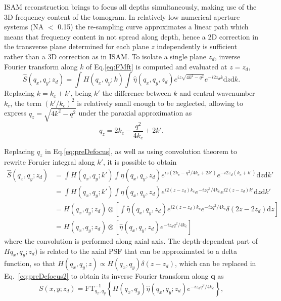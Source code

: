 ISAM reconstruction brings to focus all depths simultaneously, making use of the 3D frequency content of the tomogram. In relatively low numerical aperture systems (NA $<$ 0.15) the re-sampling curve approximates a linear path which means that frequency content in not spread along depth, hence a 2D correction in the transverse plane determined for each plane $z$ independently is sufficient~\cite{Yasuno2006_Noniterative, South2016_Computed} rather than a 3D correction as in ISAM. To isolate a single plane $z_d$, inverse Fourier transform along $k$ of Eq.\eqref{eq:FMft} is computed and evaluated at $z=z_d$,
\begin{equation}\label{eq:preDefocus}
    \hat{S}(q_x,q_y; z_d) = \int H(q_x, q_y; k) \int \hat{\eta}(q_x,q_y, z_d) e^{iz\sqrt{4k^2-q^2}} e^{-i2z_dk} \text{d}z\text{d}k.
\end{equation}
Replacing $k=k_c + k'$, being $k'$ the difference between $k$ and central wavenumber $k_c$, the term $(k'/k_c)^2$ is relatively small enough to be neglected, allowing to express $q_z=\sqrt{4k^2-q^2}$ under the paraxial approximation as~\cite{South2016_Computed}
\begin{equation}\label{eq:qzAprox}
    q_z = 2k_c - \frac{q^2}{4k_c} + 2k'.
\end{equation}

Replacing $q_z$ in Eq.\eqref{eq:preDefocus}, as well as using convolution theorem to rewrite Foruier integral along $k'$, it is possible to obtain~\cite{South2016_Computed}
\begin{align}\label{eq:preDefocus2}
    \hat{S}(q_x,q_y; z_d) &= \int H(q_x, q_y; k') \int \hat{\eta}(q_x,q_y, z_d) e^{iz(2k_c - q^2/4k_c + 2k')} e^{-i2z_d(k_c+k')} \text{d}z\text{d}k' \nonumber \\
    &= \int H(q_x, q_y; k') \int \hat{\eta}(q_x,q_y, z_d) e^{i2(z-z_d)k_c} e^{-izq^2/4k_c} e^{i2(z-z_d)k'} \text{d}z\text{d}k' \nonumber \\
    &= H(q_x, q_y; z_d) \otimes \left[ \int \hat{\eta}(q_x,q_y, z_d) e^{i2(z-z_d)k_c} e^{-izq^2/4k_c}  \delta(2z-2z_d) \text{d}z\right] \nonumber \\
    &= H(q_x, q_y; z_d) \otimes \left[ \hat{\eta}(q_x,q_y, z_d) e^{-iz_dq^2/4k_c}  \right]
\end{align}
where the convolution is performed along axial axis. The depth-dependent part of $Hq_x,q_y;z_d)$ is related to the axial PSF that can be approximated to a delta function, so that $H(q_x, q_y; z) \propto H(q_x, q_y)\delta(z-z_d)$, which can be replaced in Eq.~\eqref{eq:preDefocus2} to obtain its inverse Fourier transform along $\mathbf{q}$ as
\begin{equation}\label{eq:defocus}
    S(x, y; z_d) = \text{FT}^{-1}_{q_x, q_y}\left\{H(q_x, q_y)\hat{\eta}(q_x, q_y; z_d) e^{-iz_dq^2/4k_c}\right\},
\end{equation}

